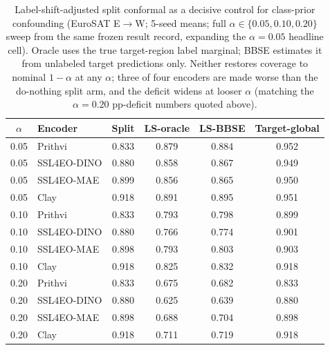 \documentclass[preprint,11pt,authoryear]{elsarticle}
\begin{document}
\begin{table}[htbp]\centering\small
\caption{Label-shift-adjusted split conformal as a decisive control for
class-prior confounding (EuroSAT E$\to$W; 5-seed means; full $\alpha\in\{0.05,0.10,0.20\}$ sweep from the
same frozen result record, expanding the $\alpha{=}0.05$ headline cell). Oracle uses the true target-region
label marginal; BBSE estimates it from unlabeled target predictions only. Neither
restores coverage to nominal $1{-}\alpha$ at any $\alpha$; three of four encoders are made worse than the
do-nothing split arm, and the deficit widens at looser $\alpha$ (matching the $\alpha=0.20$ pp-deficit
numbers quoted above).}\label{tab:labelshift}
\begin{tabular}{clcccc}
\toprule
$\alpha$ & Encoder & Split & LS-oracle & LS-BBSE & Target-global \\
\midrule
0.05 & Prithvi     & 0.833 & 0.879 & 0.884 & 0.952 \\
0.05 & SSL4EO-DINO & 0.880 & 0.858 & 0.867 & 0.949 \\
0.05 & SSL4EO-MAE  & 0.899 & 0.856 & 0.865 & 0.950 \\
0.05 & Clay        & 0.918 & 0.891 & 0.895 & 0.951 \\
\midrule
0.10 & Prithvi     & 0.833 & 0.793 & 0.798 & 0.899 \\
0.10 & SSL4EO-DINO & 0.880 & 0.766 & 0.774 & 0.901 \\
0.10 & SSL4EO-MAE  & 0.898 & 0.793 & 0.803 & 0.903 \\
0.10 & Clay        & 0.918 & 0.825 & 0.832 & 0.918 \\
\midrule
0.20 & Prithvi     & 0.833 & 0.675 & 0.682 & 0.833 \\
0.20 & SSL4EO-DINO & 0.880 & 0.625 & 0.639 & 0.880 \\
0.20 & SSL4EO-MAE  & 0.898 & 0.688 & 0.704 & 0.898 \\
0.20 & Clay        & 0.918 & 0.711 & 0.719 & 0.918 \\
\bottomrule
\end{tabular}
\end{table}
\end{document}
